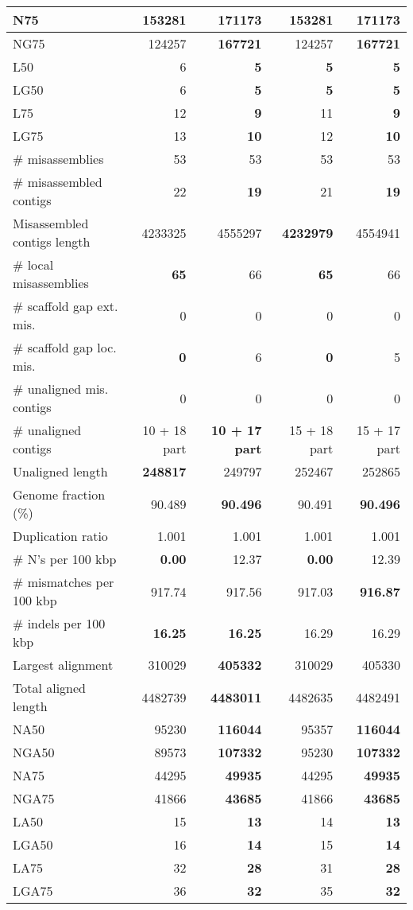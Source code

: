 \documentclass[12pt,a4paper]{article}
\begin{document}
\begin{table}[ht]
\begin{center}
\begin{tabular}{|l*{4}{|r}|}
N75 & 153281 & {\bf 171173} & 153281 & {\bf 171173} \\ \hline
NG75 & 124257 & {\bf 167721} & 124257 & {\bf 167721} \\ \hline
L50 & 6 & {\bf 5} & {\bf 5} & {\bf 5} \\ \hline
LG50 & 6 & {\bf 5} & {\bf 5} & {\bf 5} \\ \hline
L75 & 12 & {\bf 9} & 11 & {\bf 9} \\ \hline
LG75 & 13 & {\bf 10} & 12 & {\bf 10} \\ \hline
\# misassemblies & 53 & 53 & 53 & 53 \\ \hline
\# misassembled contigs & 22 & {\bf 19} & 21 & {\bf 19} \\ \hline
Misassembled contigs length & 4233325 & 4555297 & {\bf 4232979} & 4554941 \\ \hline
\# local misassemblies & {\bf 65} & 66 & {\bf 65} & 66 \\ \hline
\# scaffold gap ext. mis. & 0 & 0 & 0 & 0 \\ \hline
\# scaffold gap loc. mis. & {\bf 0} & 6 & {\bf 0} & 5 \\ \hline
\# unaligned mis. contigs & 0 & 0 & 0 & 0 \\ \hline
\# unaligned contigs & 10 + 18 part & {\bf 10 + 17 part} & 15 + 18 part & 15 + 17 part \\ \hline
Unaligned length & {\bf 248817} & 249797 & 252467 & 252865 \\ \hline
Genome fraction (\%) & 90.489 & {\bf 90.496} & 90.491 & {\bf 90.496} \\ \hline
Duplication ratio & 1.001 & 1.001 & 1.001 & 1.001 \\ \hline
\# N's per 100 kbp & {\bf 0.00} & 12.37 & {\bf 0.00} & 12.39 \\ \hline
\# mismatches per 100 kbp & 917.74 & 917.56 & 917.03 & {\bf 916.87} \\ \hline
\# indels per 100 kbp & {\bf 16.25} & {\bf 16.25} & 16.29 & 16.29 \\ \hline
Largest alignment & 310029 & {\bf 405332} & 310029 & 405330 \\ \hline
Total aligned length & 4482739 & {\bf 4483011} & 4482635 & 4482491 \\ \hline
NA50 & 95230 & {\bf 116044} & 95357 & {\bf 116044} \\ \hline
NGA50 & 89573 & {\bf 107332} & 95230 & {\bf 107332} \\ \hline
NA75 & 44295 & {\bf 49935} & 44295 & {\bf 49935} \\ \hline
NGA75 & 41866 & {\bf 43685} & 41866 & {\bf 43685} \\ \hline
LA50 & 15 & {\bf 13} & 14 & {\bf 13} \\ \hline
LGA50 & 16 & {\bf 14} & 15 & {\bf 14} \\ \hline
LA75 & 32 & {\bf 28} & 31 & {\bf 28} \\ \hline
LGA75 & 36 & {\bf 32} & 35 & {\bf 32} \\ \hline
\end{tabular}
\end{center}
\end{table}
\end{document}
